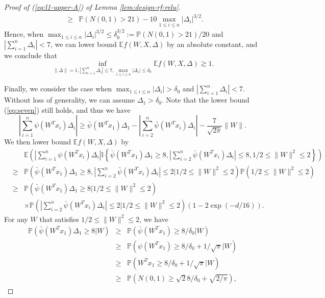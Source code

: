 \begin{proof}[Proof of (\ref{eq:l1-upper-A}) of Lemma \ref{lem:design-rf-relu}]
\begin{eqnarray}
\nonumber &\geq& \mathbb{P}\left(N(0,1)>21\right) - 10\max_{1\leq i\leq n}|\Delta_i|^{3/2}.
\end{eqnarray}
Hence, when $\max_{1\leq i\leq n}|\Delta_i|^{3/2}\leq \delta_0^{3/2}:=\mathbb{P}\left(N(0,1)>21\right)/20$ and $\left|\sum_{i=1}^n\Delta_i\right|< 7$, we can lower bound $\mathbb{E}f(W,X,\Delta)$ by an absolute constant, and we conclude that
\begin{equation}
\inf_{\|\Delta\|=1,|\sum_{i=1}^n\Delta_i|\leq 7, \max_{1\leq i\leq n}|\Delta_i|\leq\delta_0}\mathbb{E}f(W,X,\Delta) \gtrsim 1.\label{eq:l1-1-2-relu}
\end{equation}

Finally, we consider the case when $\max_{1\leq i\leq n}|\Delta_i|> \delta_0$ and $\left|\sum_{i=1}^n\Delta_i\right|< 7$. Without loss of generality, we can assume $\Delta_1>\delta_0$. Note that the lower bound (\ref{eq:seven}) still holds, and thus we have
$$\left|\sum_{i=1}^n\psi(W^Tx_i)\Delta_i\right|\geq  \bar{\psi}(W^Tx_1)\Delta_1 - \left|\sum_{i=2}^n\bar{\psi}(W^Tx_i)\Delta_i\right| - \frac{7}{\sqrt{2\pi}}\|W\|.$$
We then lower bound $\mathbb{E}f(W,X,\Delta)$ by
\begin{eqnarray*}
&& \mathbb{E}\left(\left|\sum_{i=1}^n\psi(W^Tx_i)\Delta_i\right|\mathbb{I}\left\{ \bar{\psi}(W^Tx_1)\Delta_1 \geq 8, \left|\sum_{i=2}^n\bar{\psi}(W^Tx_i)\Delta_i\right|\leq 8, 1/2\leq \|W\|^2\leq 2\right\}\right) \\
&\geq& \mathbb{P}\left(\bar{\psi}(W^Tx_1)\Delta_1 \geq 8, \left|\sum_{i=2}^n\bar{\psi}(W^Tx_i)\Delta_i\right|\leq 2\Big|1/2\leq \|W\|^2\leq 2\right)\mathbb{P}\left(1/2\leq \|W\|^2\leq 2\right) \\
&\geq& \mathbb{P}\left(\bar{\psi}(W^Tx_1)\Delta_1 \geq 8\Big|1/2\leq \|W\|^2\leq 2\right) \\
&& \times \mathbb{P}\left(\left|\sum_{i=2}^n\bar{\psi}(W^Tx_i)\Delta_i\right|\leq 2\Big|1/2\leq \|W\|^2\leq 2\right)\left(1-2\exp(-d/16)\right).
\end{eqnarray*}
For any $W$ that satisfies $1/2\leq \|W\|^2\leq 2$, we have
\begin{eqnarray*}
\mathbb{P}\left(\bar{\psi}(W^Tx_1)\Delta_1 \geq 8\Big|W\right) &\geq& \mathbb{P}\left(\bar{\psi}(W^Tx_1)\geq 8/\delta_0\Big|W\right) \\
&\geq&  \mathbb{P}\left(\psi(W^Tx_1)\geq 8/\delta_0+1/\sqrt{\pi}\Big|W\right) \\
&\geq& \mathbb{P}\left(W^Tx_1\geq 8/\delta_0+1/\sqrt{\pi}\Big|W\right) \\
&\geq& \mathbb{P}\left(N(0,1)\geq \sqrt{2}8/\delta_0 + \sqrt{2/\pi}\right),

\end{eqnarray*}
\end{proof}
